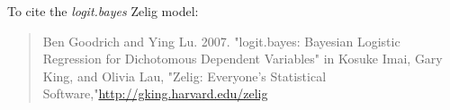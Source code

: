 To cite the \emph{ logit.bayes } Zelig model:
 \begin{verse}
 Ben Goodrich and Ying Lu. 2007. "logit.bayes: Bayesian Logistic Regression for Dichotomous Dependent Variables" in Kosuke Imai, Gary King, and Olivia Lau, "Zelig: Everyone's Statistical Software,"\url{http://gking.harvard.edu/zelig} 
\end{verse}